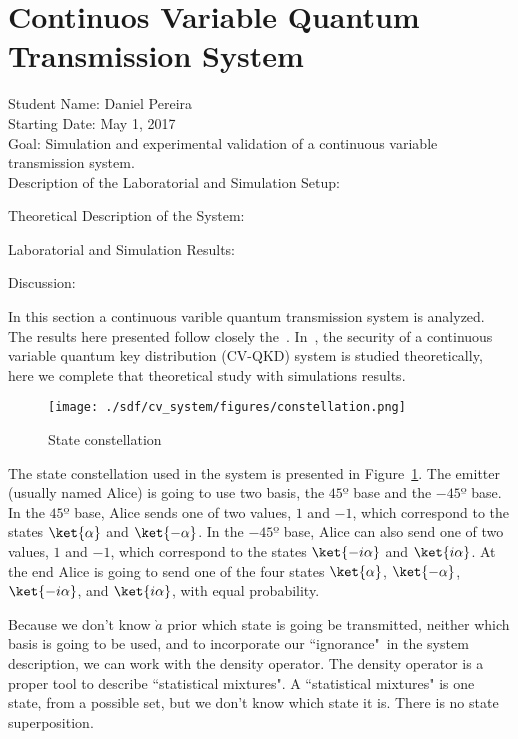 
\clearpage
\section{Continuos Variable Quantum Transmission System}\label{sec:intro}

Student Name: Daniel Pereira\\

Starting Date: May 1, 2017\\

Goal: Simulation and experimental validation of a continuous variable transmission system.\\

Description of the Laboratorial and Simulation Setup:


Theoretical Description of the System:


Laboratorial and Simulation Results:


Discussion:

In this section a continuous varible quantum transmission system is analyzed.
The results here presented follow closely the~\cite{namiki2003security}.
In~\cite{namiki2003security}, the security of a continuous variable quantum key distribution (CV-QKD) system is studied theoretically, here we complete that theoretical study with simulations results.

\begin{figure}[h]
\centering
\texttt{[image: ./sdf/cv\_system/figures/constellation.png]}
\caption{State constellation}
\label{fig:const}
\end{figure}

The state constellation used in the system is presented in Figure~\ref{fig:const}.
The emitter (usually named Alice) is going to use two basis, the $45º$ base and the $-45º$ base.
In the $45º$ base, Alice sends one of two values, $1$ and $-1$, which correspond to the states $\ket{\alpha}$ and $\ket{-\alpha}$.
In the $-45º$ base, Alice can also send one of two values, $1$ and $-1$, which correspond to the states $\ket{-i\alpha}$ and $\ket{i\alpha}$.
At the end Alice is going to send one of the four states $\ket{\alpha}$, $\ket{-\alpha}$, $\ket{-i\alpha}$, and $\ket{i\alpha}$, with equal probability.

Because we don't know $\grave{a}$ prior which state is going be transmitted, neither which basis is going to be used, and to incorporate our ``ignorance"\, in the system description, we can work with the density operator. The density operator is a proper tool to describe ``statistical mixtures". A ``statistical mixtures" is one state, from a possible set, but we don't know which state it is. There is no state superposition.

